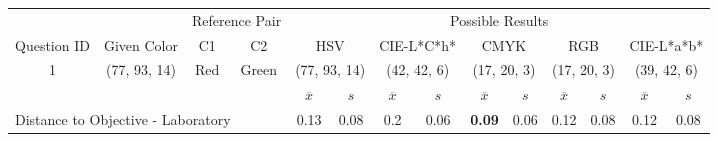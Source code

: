 \begin{table}[H]
  \resizebox{\textwidth}{!} {
  \begin{tabular}{lccccccccccccc}
    \hline
    \multicolumn{1}{c}{}                              &                                      & \multicolumn{2}{c}{Reference Pair}                   & \multicolumn{10}{c}{Possible Results}                                                                                                                                                                                                                                                                                        \\ \cline{3-14}
    \multicolumn{1}{c}{\multirow{-2}{*}{Question ID}} & \multirow{-2}{*}{Given Color}        & C1                       & C2                         & \multicolumn{2}{c}{HSV}                                        & \multicolumn{2}{c}{CIE-L*C*h*}                                 & \multicolumn{2}{c}{CMYK}                                       & \multicolumn{2}{c}{RGB}                                        & \multicolumn{2}{c}{CIE-L*a*b*}                                 \\ \hline
    \multicolumn{1}{c}{1}                             & \cellcolor[HTML]{FFFF00}(77, 93, 14) & \multicolumn{1}{c|}{Red} & \multicolumn{1}{c|}{Green} & \multicolumn{2}{c|}{\cellcolor[HTML]{FFFF00}(77, 93, 14)}      & \multicolumn{2}{c|}{\cellcolor[HTML]{D7A700}(42, 42, 6)}       & \multicolumn{2}{c|}{\cellcolor[HTML]{808000}(17, 20, 3)}       & \multicolumn{2}{c|}{\cellcolor[HTML]{808000}(17, 20, 3)}       & \multicolumn{2}{c|}{\cellcolor[HTML]{C9AB00}(39, 42, 6)}       \\ \hline
                                                      & \multicolumn{1}{l}{}                 & \multicolumn{1}{l}{}     & \multicolumn{1}{l}{}       & \multicolumn{1}{c}{$\overline{x}$} & \multicolumn{1}{c}{$s$} & \multicolumn{1}{c}{$\overline{x}$} & \multicolumn{1}{c}{$s$} & \multicolumn{1}{c}{$\overline{x}$} & \multicolumn{1}{c}{$s$} & \multicolumn{1}{c}{$\overline{x}$} & \multicolumn{1}{c}{$s$} & \multicolumn{1}{c}{$\overline{x}$} & \multicolumn{1}{c}{$s$} \\ \hline
    \multicolumn{4}{l}{Distance to Objective - Laboratory}                                                                                           & \multicolumn{1}{|c}{0.13}       & \multicolumn{1}{c|}{0.08}    & \multicolumn{1}{|c}{0.2}        & \multicolumn{1}{c|}{0.06}    & \multicolumn{1}{|c}{\textbf{0.09}}       & \multicolumn{1}{c|}{0.06}    & \multicolumn{1}{|c}{0.12}       & \multicolumn{1}{c|}{0.08}    & \multicolumn{1}{|c}{0.12}       & \multicolumn{1}{c|}{0.08}    \\

\end{tabular}}
\end{table}
